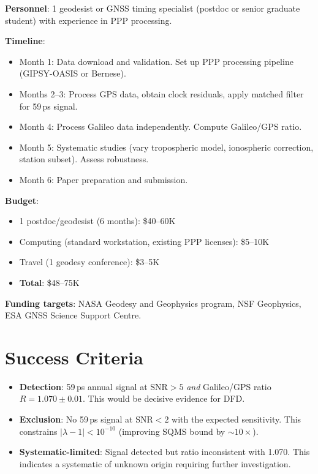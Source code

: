 \documentclass[11pt]{article}
\newcommand{\lbone}{|\lambda - 1|}
\newcommand{\SNR}{\mathrm{SNR}}
\begin{document}
\textbf{Personnel}: 1 geodesist or GNSS timing specialist (postdoc
or senior graduate student) with experience in PPP processing.

\textbf{Timeline}:
\begin{itemize}[nosep]
\item Month 1: Data download and validation. Set up PPP processing
  pipeline (GIPSY-OASIS or Bernese).
\item Months 2--3: Process GPS data, obtain clock residuals, apply
  matched filter for 59\,ps signal.
\item Month 4: Process Galileo data independently. Compute
  Galileo/GPS ratio.
\item Month 5: Systematic studies (vary tropospheric model, ionospheric
  correction, station subset). Assess robustness.
\item Month 6: Paper preparation and submission.
\end{itemize}

\textbf{Budget}:
\begin{itemize}[nosep]
\item 1 postdoc/geodesist (6 months): \$40--60K
\item Computing (standard workstation, existing PPP licenses): \$5--10K
\item Travel (1 geodesy conference): \$3--5K
\item \textbf{Total}: \$48--75K
\end{itemize}

\textbf{Funding targets}: NASA Geodesy and Geophysics program,
NSF Geophysics, ESA GNSS Science Support Centre.

\section{Success Criteria}

\begin{itemize}
\item \textbf{Detection}: 59\,ps annual signal at $\SNR > 5$
  \emph{and} Galileo/GPS ratio $R = 1.070 \pm 0.01$. This would
  be decisive evidence for DFD.
\item \textbf{Exclusion}: No 59\,ps signal at $\SNR < 2$ with
  the expected sensitivity. This constrains $\lbone < 10^{-10}$
  (improving SQMS bound by $\sim 10\times$).
\item \textbf{Systematic-limited}: Signal detected but ratio
  inconsistent with 1.070. This indicates a systematic of unknown
  origin requiring further investigation.
\end{itemize}
\end{document}
